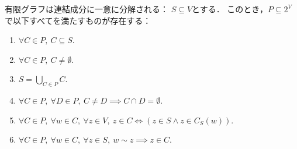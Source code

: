 \begin{lemma}
  \label{lem:exists_components}
  \leanok
  有限グラフは連結成分に一意に分解される：
  $S \subseteq V$とする．
  このとき，$P \subseteq 2^V$で以下すべてを満たすものが存在する：
  \begin{enumerate}[label = (\arabic*)]
    \item $\forall C \in P,\ C \subseteq S$.
    \item $\forall C \in P,\ C \ne \emptyset$.
    \item $S = \displaystyle \bigcup_{C \in P} C$.
    \item $\forall C \in P,\ \forall D \in P,\ C \ne D \implies C \cap D = \emptyset$.
    \item $\forall C \in P,\ \forall w \in C,\ \forall z \in V,\ z \in C \iff (z \in S \land z \in C_S(w))$.
    \item $\forall C \in P,\ \forall w \in C,\ \forall z \in S,\ w \sim z \implies z \in C$.
  \end{enumerate}
\end{lemma}

